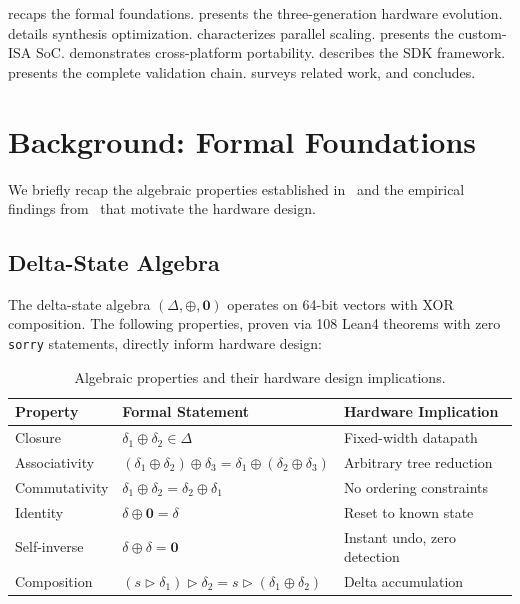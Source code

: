 \documentclass[11pt,letterpaper]{article}
\theoremstyle{plain}
\theoremstyle{definition}
\theoremstyle{remark}
\newcommand{\dcompose}{\oplus}
\newcommand{\dzero}{\mathbf{0}}
\newcommand{\transition}{\triangleright}
\begin{document}
 recaps the formal foundations.  presents the three-generation hardware evolution.  details synthesis optimization.  characterizes parallel scaling.  presents the custom-ISA SoC.  demonstrates cross-platform portability.  describes the SDK framework.  presents the complete validation chain.  surveys related work, and  concludes.

\section{Background: Formal Foundations}
\label{sec:background}

We briefly recap the algebraic properties established in~\cite{paper1} and the empirical findings from~\cite{paper2} that motivate the hardware design.

\subsection{Delta-State Algebra}

The delta-state algebra $(\Delta, \dcompose, \dzero)$ operates on 64-bit vectors with XOR composition. The following properties, proven via 108 Lean4 theorems with zero \texttt{sorry} statements, directly inform hardware design:

\begin{table}[!htbp]
\centering
\caption{Algebraic properties and their hardware design implications.}
\label{tab:properties}
\begin{tabular}{@{}lll@{}}
\toprule
\textbf{Property} & \textbf{Formal Statement} & \textbf{Hardware Implication} \\
\midrule
Closure & $\delta_1 \dcompose \delta_2 \in \Delta$ & Fixed-width datapath \\
Associativity & $(\delta_1 \dcompose \delta_2) \dcompose \delta_3 = \delta_1 \dcompose (\delta_2 \dcompose \delta_3)$ & Arbitrary tree reduction \\
Commutativity & $\delta_1 \dcompose \delta_2 = \delta_2 \dcompose \delta_1$ & No ordering constraints \\
Identity & $\delta \dcompose \dzero = \delta$ & Reset to known state \\
Self-inverse & $\delta \dcompose \delta = \dzero$ & Instant undo, zero detection \\
Composition & $(s \transition \delta_1) \transition \delta_2 = s \transition (\delta_1 \dcompose \delta_2)$ & Delta accumulation \\
\bottomrule
\end{tabular}
\end{table}
\end{document}
